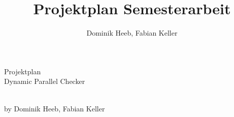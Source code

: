 \documentclass[10pt,a4paper]{article}
\author{Dominik Heeb, Fabian Keller}
\title{Projektplan Semesterarbeit}
\begin{document}
\begin{titlepage}
	\Huge
	\begin{center}
	Projektplan \\Dynamic Parallel Checker
	\end{center}\\
	
	
	by Dominik Heeb, Fabian Keller
\end{titlepage}
\end{document}
